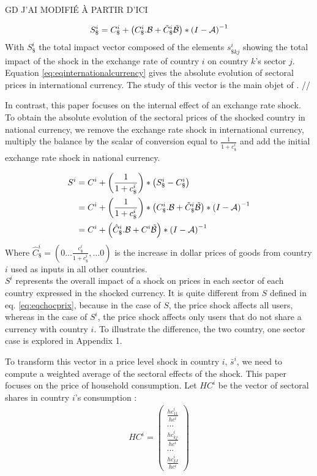 \documentclass[11pt,a4paper]{article}
\begin{document}
GD J'AI MODIFIÉ À PARTIR D'ICI
 
 \begin{eqnarray}
S_\$^i=C_\$^i+\left(C_\$^i.{\cal B}+{\tilde{C}_\$^i}{\tilde{{\cal B}}}\right)*{{(I-{\cal A})}^{-1}}	
\label{eq:eqinternationalcurrency}
 \end{eqnarray}
With $S_\$^i$ the total impact vector composed of the elements ${{{s}}^i_{\$kj}}$ showing the total impact of the shock in the exchange rate of country $i$ on country $k$'s sector $j$. Equation \ref{eq:eqinternationalcurrency} gives the absolute evolution of sectoral prices in international currency. The study of this vector is the main objet of \cite{Cochard2016}. //

In contrast, this paper focuses on the internal effect of an exchange rate shock. To obtain the absolute evolution of the sectoral prices of the shocked country in national currency, we remove the exchange rate shock in international currency, multiply the balance by the scalar of conversion equal to $\frac{1}{1+c_\$^i}$ and add the initial exchange rate shock in national currency.

\begin{equation}
\begin{aligned}
	S^i&=C^i  + \left( \frac{1}{1+{{c}_\$^i}}\right)*\left({S_\$^i}-{{C}_{\$}^i}\right)\\
	&=C^i + \left( \frac{1}{1+{{c}_\$^i}}\right)*\left(C_\$^i.{\cal B}+{\tilde{C}_\$^i}{\tilde{{\cal B}}}\right)*{{(I-{\cal A})}^{-1}} 	\\
	&=C^i	+ \left(\hat{C}^i_\$.{\cal B}+{C^i}{\tilde{{\cal B}}}\right)*{{(I-{\cal A})}^{-1}}	
\label{eq:eqdomcurrency}
\end{aligned}
\end{equation}
Where $\hat{C}^i_\$=\left(0 \ldots \frac{c_\$^i}{1+c_\$^i},\ldots 0 \right)$ is the increase in dollar prices of goods from country $i$ used as inputs in all other countries.\\ 
$S^i$ represents the overall impact of a shock on prices in each sector of each country expressed in the shocked currency.
It is quite different from $S$ defined in eq. \eqref{eq:eqchocprix}, because in the case of $S$, the price shock affects all users, whereas in the case of $S^i$, the price shock affects only users that do not share a currency with country $i$. To illustrate the difference, the two country, one sector case is explored in Appendix 1.

To transform this vector in a price level shock in country $i$, $\bar{s}^i$, we need to compute a weighted average of the sectoral effects of the shock. This paper focuses on the price of household consumption. Let $HC^i$ be the vector of sectoral shares in country $i$'s consumption :
\begin{eqnarray*}
HC^i=\left( 
	\begin{array}{c}
	\frac{{hc}_{11}^i}{hc^i} \\
	...\\
	\frac{{hc}_{kj}^i}{hc^i}\\
	...\\
	\frac{{hc}_{IJ}^i}{hc^i}
	 \end{array}
	 \right)
\end{eqnarray*}
\end{document}
